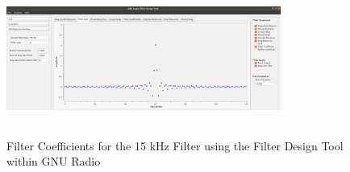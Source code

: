 \begin{figure}[h!]
	\centering
	\includegraphics[height = 5cm, width =9cm]{images/filter_tool_15kHz_taps.png} %
	\caption{Filter Coefficients for the 15 kHz Filter using the Filter Design Tool within GNU Radio}
	\label{fig:taps15}
\end{figure}   
  
 
